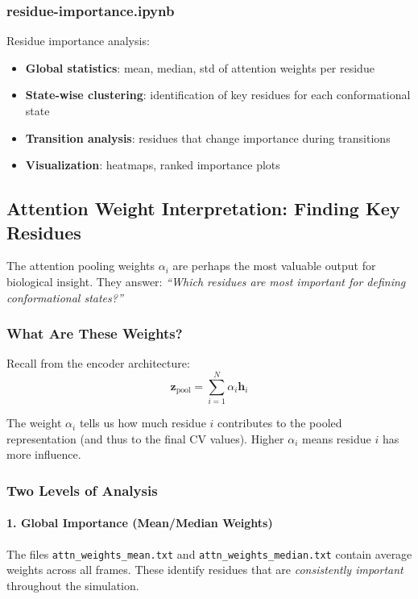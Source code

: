 \documentclass[12pt,a4paper]{article}
\begin{document}
\subsubsection{residue-importance.ipynb}
Residue importance analysis:
\begin{itemize}
    \item \textbf{Global statistics}: mean, median, std of attention weights per residue
    \item \textbf{State-wise clustering}: identification of key residues for each conformational state
    \item \textbf{Transition analysis}: residues that change importance during transitions
    \item \textbf{Visualization}: heatmaps, ranked importance plots
\end{itemize}

\subsection{Attention Weight Interpretation: Finding Key Residues}

The attention pooling weights $\alpha_i$ are perhaps the most valuable output for biological insight. They answer: \textit{``Which residues are most important for defining conformational states?''}

\subsubsection{What Are These Weights?}

Recall from the encoder architecture:
\begin{equation}
\mathbf{z}_{\text{pool}} = \sum_{i=1}^{N} \alpha_i \mathbf{h}_i
\end{equation}

The weight $\alpha_i$ tells us how much residue $i$ contributes to the pooled representation (and thus to the final CV values). Higher $\alpha_i$ means residue $i$ has more influence.

\subsubsection{Two Levels of Analysis}

\paragraph{1. Global Importance (Mean/Median Weights)}
The files \texttt{attn\_weights\_mean.txt} and \texttt{attn\_weights\_median.txt} contain average weights across all frames. These identify residues that are \textit{consistently important} throughout the simulation.
\end{document}
